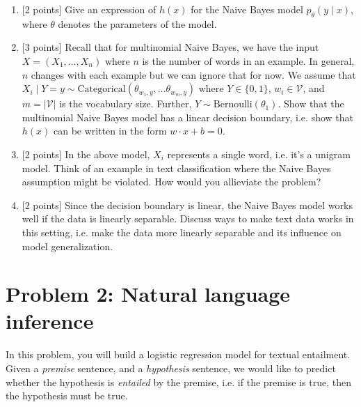 \documentclass{article}
\theoremstyle{case}
\theoremstyle{definition}
\newcommand{\recall}[1]{\noindent{[\textbf{RECALL:} #1]}}
\begin{document}
\begin{enumerate}
    \item {[2 points]} Give an expression of $h(x)$ for the Naive Bayes model $p_\theta(y\mid x)$, where $\theta$ denotes the parameters of the model.

    \newpage
\item {[3 points]} Recall that for multinomial Naive Bayes,
        we have the input $X=(X_1, \ldots, X_n)$ where $n$ is the number of words in an example.
        In general, $n$ changes with each example but we can ignore that for now.
        We assume that $X_i\mid Y=y \sim \text{Categorical}(\theta_{w_1,y}, \ldots \theta_{w_m,y})$ where $Y\in \{0, 1\}$, $w_i\in\mathcal{V}$, and $m=|\mathcal{V}|$ is the vocabulary size.
        Further, $Y\sim\text{Bernoulli}(\theta_1)$.
        Show that the multinomial Naive Bayes model has a linear decision boundary,
        i.e. show that $h(x)$ can be written in the form $w\cdot x + b=0$.
        \recall{
            The categorical distribution is a multinomial distribution with one trial.
            Its PMF is
            $$
            p(x_1,\ldots, x_m) = \prod_{i=1}^m\theta_{i}^{x_i} \;,
            $$
            where $x_i = \mathbbm{1}[x=i]$, $\sum_{i=1}^m x_i = 1$,
            and $\sum_{i=1}^m \theta_i = 1$.
        }
    
    \newpage
\item {[2 points]} In the above model, $X_i$ represents a single word, i.e. it's a unigram model.
    Think of an example in text classification where the Naive Bayes assumption might be violated.
    How would you allieviate the problem?

\item {[2 points]} Since the decision boundary is linear, the Naive Bayes model works well if the data is linearly separable.
        Discuss ways to make text data works in this setting, i.e. make the data
        more linearly separable and its influence on model generalization.

\newpage
\end{enumerate}

\section*{Problem 2: Natural language inference}
In this problem, you will build a logistic regression model for textual entailment.
Given a \textit{premise} sentence,
and a \textit{hypothesis} sentence,
we would like to predict whether the hypothesis is \textit{entailed} by the premise,
i.e. if the premise is true, then the hypothesis must be true.
\end{document}
